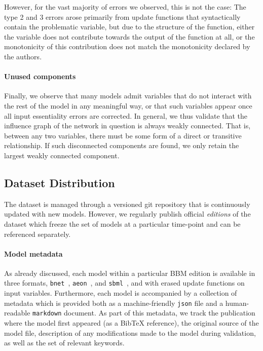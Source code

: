 \documentclass[fleqn,10pt]{wlscirep}
\begin{document}
However, for the vast majority of errors we observed, this is not the case: The type 2 and 3 errors arose primarily from update functions that syntactically contain the problematic variable, but due to the structure of the function, either the variable does not contribute towards the output of the function at all, or the monotonicity of this contribution does not match the monotonicity declared by the authors.

\paragraph*{Unused components}

Finally, we observe that many models admit variables that do not interact with the rest of the model in any meaningful way, or that such variables appear once all input essentiality errors are corrected. In general, we thus validate that the influence graph of the network in question is always weakly connected. That is, between any two variables, there must be some form of a direct or transitive relationship. If such disconnected components are found, we only retain the largest weakly connected component.

\subsection*{Dataset Distribution}

The dataset is managed through a versioned git repository that is continuously updated with new models. However, we regularly publish official \emph{editions} of the dataset which freeze the set of models at a particular time-point and can be referenced separately.

\paragraph*{Model metadata} 

As already discussed, each model within a particular BBM edition is available in three formats, \texttt{bnet}~\cite{pyboolnet}, \texttt{aeon}~\cite{aeon}, and \texttt{sbml}~\cite{sbml-qual}, and with erased update functions on input variables. Furthermore, each model is accompanied by a collection of metadata which is provided both as a machine-friendly \texttt{json} file and a human-readable \texttt{markdown} document. As part of this metadata, we track the publication where the model first appeared (as a BibTeX reference), the original source of the model file, description of any modifications made to the model during validation, as well as the set of relevant keywords.
\end{document}
